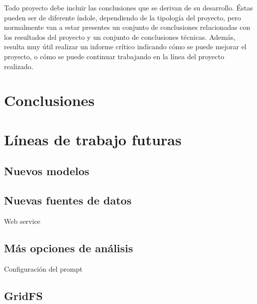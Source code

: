 
Todo proyecto debe incluir las conclusiones que se derivan de su desarrollo. 
Éstas pueden ser de diferente índole, dependiendo de la tipología del proyecto, 
pero normalmente van a estar presentes un conjunto de conclusiones relacionadas 
con los resultados del proyecto y un conjunto de conclusiones técnicas. 
Además, resulta muy útil realizar un informe crítico indicando cómo se puede 
mejorar el proyecto, o cómo se puede continuar trabajando en la línea 
del proyecto realizado. 
\section{Conclusiones}


\section{Líneas de trabajo futuras}

\subsection{Nuevos modelos}

\subsection{Nuevas fuentes de datos}
Web service

\subsection{Más opciones de análisis}
Configuración del prompt

\subsection{GridFS}
